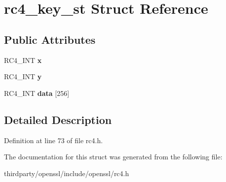 \hypertarget{structrc4__key__st}{}\section{rc4\+\_\+key\+\_\+st Struct Reference}
\label{structrc4__key__st}
\subsection*{Public Attributes}
\begin{DoxyCompactItemize}
\item 
\mbox{\label{structrc4__key__st_a0d6aa0ac8fc40a7d1464aee47b5e776d}} 
R\+C4\+\_\+\+I\+NT {\bfseries x}
\item 
\mbox{\label{structrc4__key__st_a9c19462d7de7a357d2922a3d94f89c0d}} 
R\+C4\+\_\+\+I\+NT {\bfseries y}
\item 
\mbox{\label{structrc4__key__st_aed926f06ad89470f035e17200a12b659}} 
R\+C4\+\_\+\+I\+NT {\bfseries data} \mbox{[}256\mbox{]}
\end{DoxyCompactItemize}


\subsection{Detailed Description}


Definition at line 73 of file rc4.\+h.



The documentation for this struct was generated from the following file\+:\begin{DoxyCompactItemize}
\item 
thirdparty/openssl/include/openssl/rc4.\+h\end{DoxyCompactItemize}
